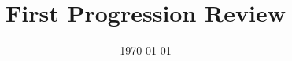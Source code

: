 \documentclass[sotoncolour]{uosthesis}      %
\title      {First Progression Review}
\date       {\today}
\begin{document}
\frontmatter
\maketitle
\begin{abstract}
\TODO
\end{abstract}







%


\end{document}

